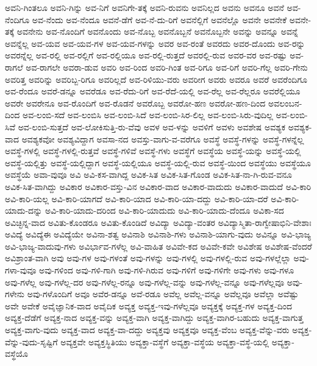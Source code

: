 {ಅವನಿ-ಗಿಂತಲೂ
ಅವನಿ-ಗಿನ್ನು
ಅವ-ನಿಗೆ
ಅವನಿಗೇ-ತಕ್ಕೆ
ಅವನಿ-ರುವನು
ಅವನಿಲ್ಲದ
ಅವನು
ಅವನೂ
ಅವನೆ
ಅವ-ನೆಂದಿಗೂ
ಅವ-ನೆಂದು
ಅವ-ನೆಂದೂ
ಅವನೆ-ಡೆಗೆ
ಅವ-ನೆ-ದು-ರಿಗೆ
ಅವನೆಲ್ಲಿಗೆ
ಅವನೆಲ್ಲೊ
ಅವನೇ
ಅವನೇಕೆ
ಅವನೇ-ತಕ್ಕೆ
ಅವನೇನು
ಅವ-ನೊಂದಿಗೆ
ಅವನೊಂದು
ಅವ-ನೊಬ್ಬ
ಅವನೊಬ್ಬನೆ
ಅವನೊಬ್ಬನೇ
ಅವನ್ನು
ಅವನ್ನೂ
ಅವನ್ನೆ
ಅವನ್ನೆಲ್ಲ
ಅವ-ಯವ
ಅವ-ಯವ-ಗಳ
ಅವ-ಯವ-ಗಳನ್ನು
ಅವರ
ಅವ-ರಂತೆ
ಅವರದು
ಅವರ-ದೊಂದು
ಅವ-ರನ್ನು
ಅವರನ್ನೆಲ್ಲ
ಅವ-ರಲ್ಲಿ
ಅವ-ರಲ್ಲಿಗೆ
ಅವ-ರಲ್ಲಿಯೂ
ಅವ-ರಲ್ಲಿ-ರುತ್ತದೆ
ಅವರಲ್ಲಿ-ರುವ
ಅವರ-ವರ
ಅವ-ರಷ್ಟು
ಅವ-ರಾಗಲೆ
ಅವ-ರಾಗಲೇ
ಅವರಾ-ಡುವ
ಅವರಿ
ಅವ-ರಿಂದ
ಅವರಿ-ಗಿಂತ
ಅವ-ರಿಗೂ
ಅವ-ರಿಗೆ
ಅವರಿ-ಗೆಲ್ಲ
ಅವರಿ-ಗೇನು
ಅವರಿತ್ತ
ಅವರಿನ್ನು
ಅವರಿಬ್ಬ-ರಿಗೂ
ಅವರಿಲ್ಲದೆ
ಅವ-ರಿಳಿಯು-ವರು
ಅವರೀಗ
ಅವರು
ಅವರೂ
ಅವರೆ
ಅವರೆಂದಿಗೂ
ಅವ-ರೆಂದೂ
ಅವರೆ-ಡನ್ನೂ
ಅವರೆಡೂ
ಅವ-ರೆದು-ರಿಗೆ
ಅವ-ರೆದೆ-ಯಲ್ಲಿ
ಅವ-ರೆಲ್ಲ
ಅವ-ರೆಲ್ಲರೂ
ಅವರೆಲ್ಲಿಯೂ
ಅವರೇ
ಅವರೇನೂ
ಅವ-ರೊಂದಿಗೆ
ಅವ-ರೊಡನೆ
ಅವರೊಬ್ಬ
ಅವರೋ-ಹಣ
ಅವರೋ-ಹಣ-ದಿಂದ
ಅವಲಂಬನ-ದಿಂದ
ಅವ-ಲಂಬಿ-ಸದೆ
ಅವ-ಲಂಬಿಸಿ
ಅವ-ಲಂಬಿ-ಸಿದೆ
ಅವ-ಲಂಬಿ-ಸಿರ-ಲಿಲ್ಲ
ಅವ-ಲಂಬಿ-ಸಿರು-ವುದಿಲ್ಲ
ಅವ-ಲಂಬಿ-ಸಿವೆ
ಅವ-ಲಂಬಿ-ಸುತ್ತದೆ
ಅವ-ಲೋಕಿಸುತ್ತಿ-ರು-ವೆವು
ಅವಳ
ಅವ-ಳನ್ನು
ಅವಳಿಗೆ
ಅವಳು
ಅವಶೇಷ
ಅವಶ್ಯಕ
ಅವಶ್ಯಕ-ವಾದ
ಅವಶ್ಯಕವೋ
ಅವಶ್ಯವಿದ್ದಾಗ
ಅವಸಾ-ನದ
ಅವಸ್ತು-ವಾಗು-ವ-ವರೆಗೂ
ಅವಸ್ಥೆ
ಅವಸ್ಥೆ-ಗಳನ್ನು
ಅವಸ್ಥೆ-ಗಳನ್ನೆಲ್ಲ
ಅವಸ್ಥೆ-ಗಳಲ್ಲಿ
ಅವಸ್ಥೆ-ಗಳಲ್ಲಿ-ರುತ್ತವೆ
ಅವಸ್ಥೆ-ಗಳಿವೆ
ಅವಸ್ಥೆ-ಗಳು
ಅವಸ್ಥೆಗೆ
ಅವಸ್ಥೆಯ
ಅವಸ್ಥೆ-ಯನ್ನು
ಅವಸ್ಥೆ-ಯಲ್ಲಿ
ಅವಸ್ಥೆ-ಯಲ್ಲಿತ್ತು
ಅವಸ್ಥೆ-ಯಲ್ಲಿದ್ದಾಗ
ಅವಸ್ಥೆ-ಯಲ್ಲಿಯೂ
ಅವಸ್ಥೆ-ಯಲ್ಲಿ-ರುವ
ಅವಸ್ಥೆ-ಯಿಂದ
ಅವಸ್ಥೆಯು
ಅವಸ್ಥೆಯೂ
ಅವಸ್ಥೆಯೆ
ಅವಾ-ವುವೂ
ಅವಿ
ಅವಿ-ಕಸ-ವಾಗಿದ್ದ
ಅವಿಕ-ಸಿತ
ಅವಿಕ-ಸಿತ-ಗೊಂಡ
ಅವಿಕ-ಸಿತ-ನಾ-ಗಿ-ರುವ-ವನೂ
ಅವಿಕ-ಸಿತ-ವಾಗಿದ್ದು
ಅವಿಕಾರ
ಅವಿಕಾರ-ವಸ್ತು-ವಿನ
ಅವಿಕಾರ-ವಾದ
ಅವಿಕಾರ-ವಾದುದು
ಅವಿಕಾರ-ವಾದುದೆ
ಅವಿ-ಕಾರಿ
ಅವಿ-ಕಾರಿ-ಯಲ್ಲ
ಅವಿ-ಕಾರಿ-ಯಾಗದೆ
ಅವಿ-ಕಾರಿ-ಯಾದ
ಅವಿ-ಕಾರಿ-ಯಾ-ದದ್ದು
ಅವಿ-ಕಾರಿ-ಯಾ-ದರೆ
ಅವಿ-ಕಾರಿ-ಯಾದು-ದನ್ನು
ಅವಿ-ಕಾರಿ-ಯಾದು-ದರಿಂದ
ಅವಿ-ಕಾರಿ-ಯಾದುದು
ಅವಿ-ಕಾರಿ-ಯಾದು-ದೆಂದೂ
ಅವಿಕಾ-ಸದ
ಅವಿಚ್ಛಿನ್ನ-ವಾದ
ಅವಿತು-ಕೊಂಡರೂ
ಅವಿತು-ಕೊಂಡಿದೆ
ಅವಿದ್ಯಾ
ಅವಿದ್ಯಾ-ವಂತರ
ಅವಿದ್ಯಾಸ್ಮಿತಾ-ರಾಗ್ವೇಷಾಭಿನಿ-ವೇಶಾಃ
ಅವಿದ್ಯೆ
ಅವಿದ್ಯೆಈ
ಅವಿದ್ಯೆಯೇ
ಅವಿನಾ-ಶತ್ವ
ಅವಿನಾಶಿ
ಅವಿನಾಶಿ-ಗಳು
ಅವಿನಾಶಿ-ಯಾಗು-ವುದು
ಅವಿನ್ನೂ
ಅವಿ-ಭಾಜ್ಯ
ಅವಿ-ಭಾಜ್ಯ-ವಾದುವು-ಗಳು
ಅವಿರ್ಭಾವ-ಗಳೆಲ್ಲ
ಅವಿ-ವಾಹಿತ
ಅವಿವೇ-ಕದ
ಅವಿವೇ-ಕವೇ
ಅವಿಶೇಷ
ಅವಿಶೇಷ-ವೆಂದರೆ
ಅವಿಶ್ರಾಂತ-ವಾಗಿ
ಅವು
ಅವು-ಗಳ
ಅವು-ಗಳಂತೆ
ಅವು-ಗಳನ್ನು
ಅವು-ಗಳಲ್ಲಿ
ಅವು-ಗಳಲ್ಲಿ-ರುವ
ಅವು-ಗಳಲ್ಲೆಲ್ಲಾ
ಅವು-ಗಳಾ-ವುವೂ
ಅವು-ಗಳಿಂದ
ಅವು-ಗಳಿ-ಗಾಗಿ
ಅವು-ಗಳಿ-ಗಿರುವ
ಅವು-ಗಳಿಗೆ
ಅವು-ಗಳಿಗೇ
ಅವು-ಗಳು
ಅವು-ಗಳೂ
ಅವು-ಗಳೆಲ್ಲ
ಅವು-ಗಳೆಲ್ಲ-ದರ
ಅವು-ಗಳೆಲ್ಲ-ರನ್ನೂ
ಅವು-ಗಳೆಲ್ಲ-ವನ್ನು
ಅವು-ಗಳೆಲ್ಲ-ವನ್ನೂ
ಅವು-ಗಳೆಲ್ಲವೂ
ಅವು-ಗಳೇನು
ಅವು-ಗಳೊಂದಿಗೆ
ಅವೂ
ಅವೆರ-ಡನ್ನೂ
ಅವೆ-ರಡೂ
ಅವೆಲ್ಲ
ಅವೆಲ್ಲ-ವನ್ನೂ
ಅವೆಲ್ಲವೂ
ಅವೆಲ್ಲಾ
ಅವೆಷ್ಟು
ಅವೇ
ಅವೇಕೆ
ಅವೈಜ್ಞಾನಿಕ-ವಾದ
ಅವೈದಿಕ
ಅವ್ಯಕ್ತ
ಅವ್ಯಕ್ತ-ಇವು-ಗಳೆಲ್ಲವೂ
ಅವ್ಯಕ್ತಕ್ಕೆ
ಅವ್ಯಕ್ತ-ಗಳ
ಅವ್ಯಕ್ತ-ದಿಂದ
ಅವ್ಯಕ್ತ-ದೆಡೆಗೆ
ಅವ್ಯಕ್ತ-ನಾದ
ಅವ್ಯಕ್ತ-ವನ್ನು
ಅವ್ಯಕ್ತ-ವಾಗಿ
ಅವ್ಯಕ್ತ-ವಾಗಿದ್ದು
ಅವ್ಯಕ್ತ-ವಾಗಿರ-ಬಹುದು
ಅವ್ಯಕ್ತ-ವಾಗುತ್ತ
ಅವ್ಯಕ್ತ-ವಾಗು-ವುದು
ಅವ್ಯಕ್ತ-ವಾದ
ಅವ್ಯಕ್ತ-ವಾ-ದದ್ದು
ಅವ್ಯಕ್ತವು
ಅವ್ಯಕ್ತವೂ
ಅವ್ಯಕ್ತ-ವೆಂಬ
ಅವ್ಯಕ್ತ-ವೆನ್ನು-ವರು
ಅವ್ಯಕ್ತ-ವೆನ್ನು-ವುದು-ಸೃಷ್ಟಿಗೆ
ಅವ್ಯಕ್ತವೇ
ಅವ್ಯಕ್ತಸ್ಥಿತಿಯು
ಅವ್ಯಕ್ತಾ-ವಸ್ಥೆಗೆ
ಅವ್ಯಕ್ತಾ-ವಸ್ಥೆಯ
ಅವ್ಯಕ್ತಾ-ವಸ್ಥೆ-ಯಲ್ಲಿ
ಅವ್ಯಕ್ತಾ-ವಸ್ಥೆಯೊ
}
